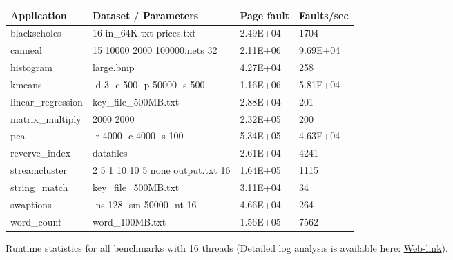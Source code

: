 \begin{figure}[t]
\centering
\myfontsize
{
\begin{tabular}{m{1.6cm}|m{3.2cm}| m{1.1cm}|m{1.3cm}}
   { Application} & Dataset / Parameters & Page fault & Faults/sec\\
  \hline \hline
    blackscholes& 16 in\_64K.txt prices.txt & 2.49E+04& 1704 \\
    canneal& 15 10000 2000 100000.nets 32 & 2.11E+06 & 9.69E+04 \\
    histogram& large.bmp & 4.27E+04 & 258	  \\
    kmeans& -d 3 -c 500 -p 50000 -s 500 & 1.16E+06 & 5.81E+04  \\
    linear\_regression& key\_file\_500MB.txt & 2.88E+04 & 201  \\
    matrix\_multiply& 2000 2000 & 2.32E+05 & 200  \\
    pca& -r 4000 -c 4000 -s 100 & 5.34E+05 & 4.63E+04\\
    reverve\_index & datafiles & 2.61E+04 & 4241  \\
    streamcluster& 2 5 1 10 10 5 none output.txt 16 & 1.64E+05 & 1115\\
    string\_match &key\_file\_500MB.txt & 3.11E+04 & 34\\
    swaptions & -ns 128 -sm 50000 -nt 16  & 4.66E+04 & 264 \\
    word\_count& word\_100MB.txt	 & 1.56E+05 & 7562  \\

\hline
\end{tabular}
}


\caption{\label{tab:apps} Runtime statistics for all benchmarks with 16 threads (Detailed log analysis is available here: \href{https://mic92.github.io/inspector/index.html\#measurement_table}{Web-link}). }                                                                                                                                  


\end{figure}
